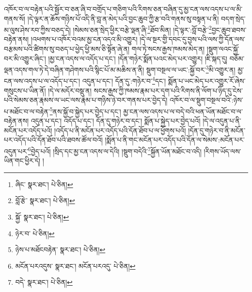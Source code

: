 འཁོར་བ་ལ་བརྟེན་པའི་སྦྱོར་བ་ཅན་ཞི་བ་བགྲོད་པ་གཅིག་པའི་རིགས་ཅན་བཞིན་དུ་མྱ་ངན་ལས་འདས་པ་ལ་མི་གནས་སོ། །དེ་ལྟར་ན་ཆོས་གཉིས་པོ་འདི་ནི་བླ་ན་མེད་པའི་བྱང་ཆུབ་ཀྱི་རྩ་བའི་གནས་སུ་བསྟན་པ་ནི། བདག་སྲེད་མ་ལུས་ཤེས་རབ་ཀྱིས་བཅད་དེ། །སེམས་ཅན་སྲེད་ཕྱིར་བརྩེ་ལྡན་ཞི་\footnote{ཞིང་  སྣར་ཐང་།  པེ་ཅིན། }ཐོབ་མིན། །དེ་ལྟར་:བློ་བརྩེ་\footnote{བློ་རྩེ་  སྣར་ཐང་།  པེ་ཅིན། }བྱང་ཆུབ་ཐབས་བརྟེན་ནས། །འཕགས་པ་འཁོར་བའམ་མྱ་ངན་འདའ་མི་འགྱུར། །དེ་ལ་སྔར་གྱི་དབང་དུ་བྱས་པའི་ལས་ཀྱི་དོན་ལས་བརྩམས་པའི་ཚིགས་སུ་བཅད་པ་ཕྱེད་ཕྱི་མས་ཅི་སྟོན་ཞེ་ན། གལ་ཏེ་སངས་རྒྱས་ཁམས་མེད་ན། །སྡུག་ལའང་སྐྱོ་བར་མི་འགྱུར་ཞིང་། །མྱ་ངན་འདས་ལ་འདོད་པ་དང་། །དོན་གཉེར་སྨོན་པའང་མེད་པར་འགྱུར། །ཇི་སྐད་དུ། བཅོམ་ལྡན་འདས་གལ་ཏེ་དེ་བཞིན་གཤེགས་པའི་སྙིང་པོ་མ་མཆིས་ན་ནི། སྡུག་བསྔལ་ལ་ཡང་:སྐྱོ་བར་\footnote{སྐྱོ་  སྣར་ཐང་།  པེ་ཅིན། }མི་འགྱུར་ན། མྱ་ངན་ལས་འདས་པ་ལ་འདོད་པ་དང་། འདུན་པ་དང་། དོན་དུ་:གཉེར་བ་\footnote{ཉེར་བ་  པེ་ཅིན། }དང་། སྨོན་པ་ཡང་མེད་པར་འགྱུར་རོ་ཞེས་གསུངས་པ་ཡིན་ནོ། །དེ་ལ་མདོར་བསྡུ་ན། སངས་རྒྱས་ཀྱི་ཁམས་རྣམ་པར་དག་པའི་རིགས་ནི་ལོག་པ་ཉིད་དུ་ངེས་པའི་སེམས་ཅན་རྣམས་ལ་ཡང་ལས་རྣམ་པ་གཉིས་ཉེ་བར་གནས་པར་བྱེད་དེ། འཁོར་བ་ལ་སྡུག་བསྔལ་བའི་:ཉེས་པ་མཐོང་བ་ལ་བརྟེན་\footnote{ཉེས་པ་མཐོངབརྟེན་  སྣར་ཐང་།  པེ་ཅིན། }ནས་སྐྱོ་བ་སྐྱེད་པར་བྱེད་པ་དང་། མྱ་ངན་ལས་འདས་པ་ལ་བདེ་བའི་ཕན་ཡོན་མཐོང་བ་ལ་བརྟེན་ནས། འདུན་པ་དང་། འདོད་པ་དང་། དོན་དུ་གཉེར་བ་དང་། སྨོན་པ་སྐྱེད་པར་བྱེད་པའོ། །དེ་ལ་འདུན་པ་ནི་མངོན་པར་འདོད་པའོ། །འདོད་པ་ནི་མངོན་པར་འདོད་པའི་དོན་ཐོབ་པ་ལ་ཕྱོགས་པའོ། །དོན་དུ་གཉེར་བ་ནི་མངོན་པར་འདོད་པའི་དོན་ཐོབ་པའི་ཐབས་ཚོལ་བའོ། །སྨོན་པ་ནི་གང་མངོན་པར་འདོད་པའི་དོན་ལ་སེམས་:མངོན་པར་འདུན་པར་\footnote{མངོན་པརའདུས་  སྣར་ཐང་། མངོན་པརའདུ་  པེ་ཅིན། }བྱེད་པའོ། །སྲིད་དང་མྱ་ངན་འདས་ལ་དེའི། །སྡུག་བདེའི་\footnote{བདེ་  སྣར་ཐང་།  པེ་ཅིན། }སྐྱོན་ཡོན་མཐོང་བ་འདི། །རིགས་ཡོད་ལས་ཡིན་གང་ཕྱིར་དེ། །
